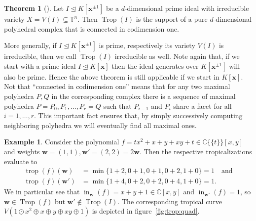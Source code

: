 \documentclass[
  paper=a4,
  titlepage,
  bibliography=totoc,
  listof=totoc,
  pagesize=pdftex
]{scrartcl}
\numberwithin{figure}{section}
\numberwithin{equation}{section}
\numberwithin{table}{section}
\newcommand*\setC{\mathds{C}}
\newcommand*\setT{\mathds{T}}
\newcommand*\puiseux[2]{#1\{\!\{#2\}\!\}}
\newcommand*\CCt{\puiseux{\setC}{t}}
\let\vec\mathbf
\let\idealof\trianglelefteq
\DeclareMathOperator{\Trop}{Trop}
\DeclareMathOperator{\trop}{trop}
\DeclareMathOperator{\initial}{in}
\theoremstyle{definition}
\newtheorem{theorem}[definition]{Theorem}
\newtheorem{example}[definition]{Example}
\numberwithin{definition}{section}
\begin{document}
\begin{theorem}[{\cite[Theorem~3.5.1]{sturmMacTrop}}]
  \label{thm:tropComplexConn}
  Let $I \idealof K[\vec x^{\pm1}]$ be a $d$-dimensional prime ideal with irreducible
  variety $X = V(I) \subseteq \setT^n$. Then $\Trop(I)$ is the support of a pure
  $d$-dimensional polyhedral complex that is connected in codimension one.
\end{theorem}

More generally, if $I \idealof K[\vec x^{\pm1}]$ is prime, respectively its variety $V(I)$
is irreducible, then we call $\Trop(I)$ irreducible as well. Note again that, if we start
with a prime ideal $I \idealof K[\vec x]$ then the ideal generates over $K[\vec x^{\pm1}]$
will also be prime. Hence the above theorem is still applicable if we start in $K[\vec
x]$. Not that \enquote{connected in codimension one} means that for any two maximal
polyhedra $P, Q$ in the corresponding complex there is a sequence of maximal polyhedra $P
= P_0, P_1, \dots, P_r = Q$ such that $P_{i-1}$ and $P_i$ share a facet for all $i = 1,
\dots, r$. This important fact ensures that, by simply successively computing neighboring
polyhedra we will eventually find all maximal ones.

\begin{example}
  \label{ex:notFan}
  Consider the polynomial $f = tx^2 + x + y + xy + t \in \CCt[x,y]$ and weights $\vec w =
  (1,1), \vec w' = (2,2) = 2 \vec w$. Then the respective tropicalizations evaluate to
  \begin{align*}
    \trop(f)(\vec w) &= \min \{ 1 + 2, 0 + 1, 0 + 1, 0 + 2, 1 + 0 \} = 1 \quad
    \text{and} \\
    \trop(f)(\vec w') &= \min \{ 1 + 4, 0 + 2, 0 + 2, 0 + 4, 1 + 0 \} = 1.
  \end{align*}
  We in particular see that $\initial_{\vec w}(f) = x+y+1 \in \setC[x,y]$ and
  $\initial_{\vec w'}(f) = 1$, so $\vec w \in \Trop(f)$ but $\vec w' \not\in \Trop(I)$.
  The corresponding tropical curve $V(1\odot x^2 \oplus x \oplus y \oplus xy \oplus 1)$ is
  depicted in figure~\ref{fig:trop:quad}.
\end{example}
\end{document}
